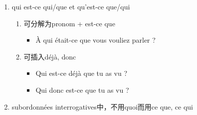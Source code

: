 \documentclass[UTF8]{report}
\begin{document}
\begin{enumerate}
    \item qui est-ce qui/que et qu’est-ce que/qui
    \begin{enumerate}
        \item 可分解为pronom + est-ce que
        \begin{itemize}
            \item À qui était-ce que vous vouliez parler ?
        \end{itemize}
        \item 可插入déjà, donc
        \begin{itemize}
            \item Qui est-ce déjà que tu as vu ?
            \item Qui donc est-ce que tu as vu ?
        \end{itemize}
    \end{enumerate}
    \item subordonnées interrogatives中，不用quoi而用ce que, ce qui
\end{enumerate}
\end{document}
